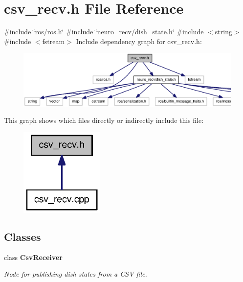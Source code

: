 \section{csv\-\_\-recv.\-h \-File \-Reference}
\label{csv__recv_8h}
{\ttfamily \#include \char`\"{}ros/ros.\-h\char`\"{}}\*
{\ttfamily \#include \char`\"{}neuro\-\_\-recv/dish\-\_\-state.\-h\char`\"{}}\*
{\ttfamily \#include $<$string$>$}\*
{\ttfamily \#include $<$fstream$>$}\*
\-Include dependency graph for csv\-\_\-recv.\-h\-:\nopagebreak
\begin{figure}[H]
\begin{center}
\leavevmode
\includegraphics[width=350pt]{csv__recv_8h__incl}
\end{center}
\end{figure}
\-This graph shows which files directly or indirectly include this file\-:\nopagebreak
\begin{figure}[H]
\begin{center}
\leavevmode
\includegraphics[width=118pt]{csv__recv_8h__dep__incl}
\end{center}
\end{figure}
\subsection*{\-Classes}
\begin{DoxyCompactItemize}
\item 
class {\bf \-Csv\-Receiver}
\begin{DoxyCompactList}\small\item\em \-Node for publishing dish states from a \-C\-S\-V file. \end{DoxyCompactList}\end{DoxyCompactItemize}
